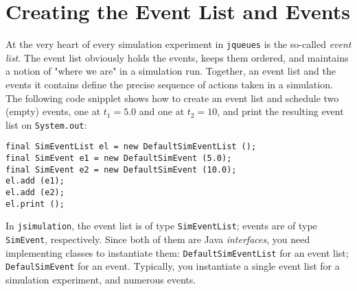 \documentclass[12pt]{book}
\begin{document}
\section{Creating the Event List and Events}

At the very heart of every simulation experiment
  in \lstinline{jqueues}
  is the so-called {\em event list}.
The event list obviously holds the events,
  keeps them ordered,
  and maintains a notion of "where we are" in a simulation run.
Together, an event list and the events it contains define
  the precise sequence of actions taken in a simulation.
The following code snipplet shows how to create an event list and
  schedule two (empty) events, one at $t_{1}=5.0$ and one at $t_{2}=10$,
  and print the resulting event list on \lstinline{System.out}:
\begin{lstlisting}
final SimEventList el = new DefaultSimEventList ();
final SimEvent e1 = new DefaultSimEvent (5.0);
final SimEvent e2 = new DefaultSimEvent (10.0);
el.add (e1);
el.add (e2);
el.print ();
\end{lstlisting}
In \lstinline{jsimulation},
  the event list is of type \lstinline{SimEventList};
  events are of type \lstinline{SimEvent},
  respectively.
Since both of them are Java {\em interfaces}, you need implementing classes
  to instantiate them: \lstinline{DefaultSimEventList} for an event list;
  \lstinline{DefaulSimEvent} for an event.
Typically,
  you instantiate a single event list for a simulation experiment,
  and numerous events.
\end{document}
